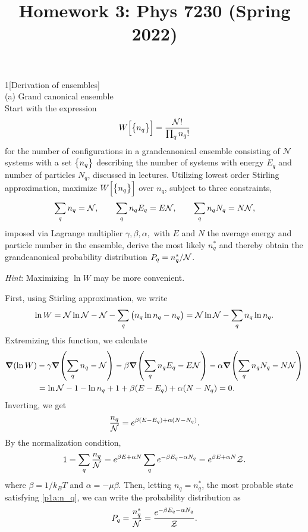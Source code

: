 \documentclass[12pt]{article}
\title{Homework 3: Phys 7230 (Spring 2022)}
\begin{document}
\maketitle
\begin{problem}{1}[Derivation of ensembles]~\\
(a) Grand canonical ensemble~\\
Start with the expression
\begin{equation}
    W\qty[\qty{n_q}]=\frac{\mathcal{N}!}{\prod_qn_q!} 
\end{equation}
for the number of configurations in a grandcanonical ensemble consisting of
$\mathcal{N}$ systems with a set $\qty{n_q}$ describing the number of systems
with energy $E_q$ and number of particles $N_q$, discussed in lectures.
Utilizing lowest order Stirling approximation, maximize $W\qty[\qty{n_q}]$ over
$n_q$, subject to three constraints,
\begin{equation}
    \sum_qn_q=\mathcal{N},\qquad\sum_qn_qE_q=E\mathcal{N},\qquad\sum_qn_qN_q=N\mathcal{N} ,
\end{equation}
imposed via Lagrange multiplier $\gamma,\beta,\alpha,$ with $E$ and $N$ the
average energy and particle number in the ensemble, derive the most likely
$n_q^\ast$ and thereby obtain the grandcanonical probability distribution
$P_q=n_q^\ast/\mathcal{N}$.

\textit{Hint}: Maximizing $\ln W$ may be more convenient.
\begin{solution}
First, using Stirling approximation, we write
\begin{equation}
    \ln W=\mathcal{N}\ln\mathcal{N} -\mathcal{N}-\sum_q\qty(n_q\ln n_q - n_q)
    =\mathcal{N}\ln\mathcal{N}-\sum_qn_q\ln n_q.
\end{equation}
Extremizing this function, we calculate
\begin{align}
    \grad(\ln W)
    &-\gamma\grad\qty(\sum_qn_q-\mathcal{N})
    -\beta\grad\qty(\sum_qn_qE_q-E\mathcal{N})
    -\alpha\grad\qty(\sum_qn_qN_q-N\mathcal{N})\notag\\
    \qquad&=\ln\mathcal{N}-1-\ln n_q+1+\beta(E-E_q)+\alpha(N-N_q)=0.
\end{align}
Inverting, we get
\begin{equation}\label{p1a:n_q}
    \frac{n_q}{\mathcal{N}}=e^{\beta(E-E_q)+\alpha(N-N_q)}.
\end{equation}
By the normalization condition,
\begin{equation}
    1=\sum_q\frac{n_q}{\mathcal{N}}=e^{\beta E+\alpha N}\sum_qe^{-\beta E_q-\alpha N_q}
    =e^{\beta E+\alpha N}\mathcal{Z}.
\end{equation}
where $\beta=1/k_BT$ and $\alpha=-\mu\beta$. Then, letting $n_q=n_q^\ast$, the
most probable state satisfying \eqref{p1a:n_q}, we can write the probability
distribution as
\begin{equation}
    P_q=\frac{n_q^\ast}{\mathcal{N}}=\frac{e^{-\beta E_q-\alpha N_q}}{\mathcal{Z}}  .
\end{equation}
\end{solution}


\end{problem}
\end{document}
